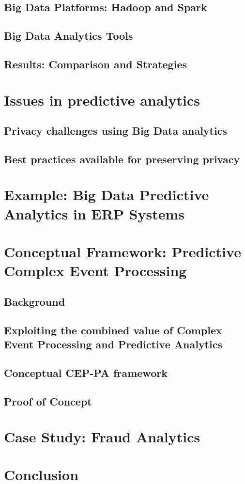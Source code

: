 \documentclass[runningheads]{llncs}
\begin{document}
\subsection{Big Data Platforms: Hadoop and Spark}
\subsection{Big Data Analytics Tools}
\subsection{Results: Comparison and Strategies}
\section{Issues in predictive analytics}
\subsection{Privacy challenges using Big Data analytics}
\subsection{Best practices available for preserving privacy}
\section{Example: Big Data Predictive Analytics in ERP Systems}
\section{Conceptual Framework: Predictive Complex Event Processing}
\subsection{Background}
\subsection{Exploiting the combined value of Complex Event Processing and Predictive Analytics}
\subsection{Conceptual CEP-PA framework}
\subsection{Proof of Concept}
\section{Case Study: Fraud Analytics}

\section{Conclusion}


\end{document}
